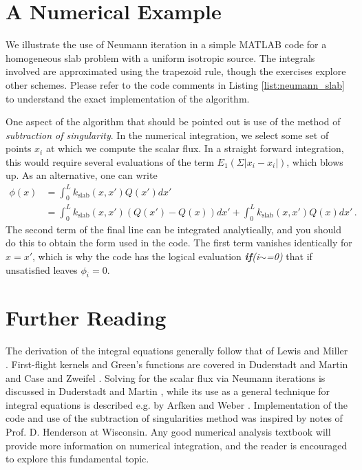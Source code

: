 \section*{A Numerical Example}

We illustrate the use of Neumann iteration in a simple MATLAB code for a homogeneous slab problem with a uniform isotropic source.  The integrals involved are approximated using the trapezoid rule, though the exercises explore other schemes.  Please refer to the code comments in Listing \ref{list:neumann_slab} to understand the exact implementation of the algorithm.

One aspect of the algorithm that should be pointed out is use of the method of \textit{subtraction of singularity}.  In the numerical integration, we select some set of points $x_i$ at which we compute the scalar flux.  In a straight forward integration, this would require several evaluations of the term $E_1(\Sigma|x_i-x_i|)$, which blows up.  As an alternative, one can write
\begin{equation}
\begin{split}
  \phi(x) &= \int^L_0 k_{\text{slab}}(x,x') Q(x')dx' \\
          &= \int^L_0 k_{\text{slab}}(x,x') (Q(x')-Q(x))dx' +  \int^L_0 k_{\text{slab}}(x,x') Q(x)dx'  \, .
\end{split}
\end{equation}
The second term of the final line can be integrated analytically, and you should do this to obtain the form used in the code.  The first term vanishes identically for $x=x'$, which is why the code has the logical evaluation \textsl{\textbf{if}(i$\sim$=0)} that if unsatisfied leaves $\phi_i = 0$.




\section*{Further Reading}

The derivation of the integral equations generally follow that of Lewis and Miller \cite{lewis1993cmn}.  First-flight kernels and Green's functions are covered in Duderstadt and Martin \cite{duderstadt1976tt} and Case and Zweifel \cite{case1967ltt}.  Solving for the scalar flux via Neumann iterations is discussed in Duderstadt and Martin \cite{duderstadt1976tt}, while its use as a general technique for integral equations is described e.g. by Arfken and Weber \cite{arfken1995mmp}.  Implementation of the code and use of the subtraction of singularities method was inspired by notes of Prof. D. Henderson at Wisconsin. Any good numerical analysis textbook will provide more information on numerical integration, and the reader is encouraged to explore this fundamental topic.    

